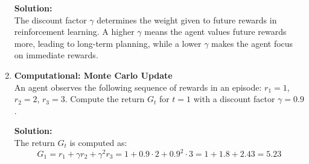 \documentclass{article}
\begin{document}
\begin{enumerate}[label=Q\arabic*.]
\textbf{Solution:} \\
The discount factor $\gamma$ determines the weight given to future rewards in reinforcement learning. A higher $\gamma$ means the agent values future rewards more, leading to long-term planning, while a lower $\gamma$ makes the agent focus on immediate rewards.

\item \textbf{Computational: Monte Carlo Update} \\
An agent observes the following sequence of rewards in an episode: $r_1 = 1$, $r_2 = 2$, $r_3 = 3$. Compute the return $G_t$ for $t=1$ with a discount factor $\gamma = 0.9$.

\textbf{Solution:} \\
The return $G_t$ is computed as:
\[
G_1 = r_1 + \gamma r_2 + \gamma^2 r_3 = 1 + 0.9 \cdot 2 + 0.9^2 \cdot 3 = 1 + 1.8 + 2.43 = 5.23
\]

\end{enumerate}
\end{document}
